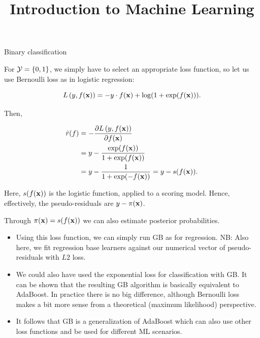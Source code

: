  





\newcommand{\titlefigure}{figure/boosting_classif_title.png}
\newcommand{\learninggoals}{
  \item Transfering gradient boosting for regression to binary classification problems
  \item Introducing gradient boosting for multiclass problems
}

\title{Introduction to Machine Learning}
\date{}





\begin{vbframe}{Binary classification}


For $\mathcal{Y} = \{0, 1\}$, we simply have to select an appropriate loss function, so let us
use Bernoulli loss as in logistic regression:

$$ L\left(y, f(\mathbf{x})\right) = - y \cdot f(\mathbf{x}) + \log(1 + \exp(f(\mathbf{x}))).$$

Then,

\vspace{-0.5cm}

\begin{align*}
\tilde{r}(f) &=-\frac{\partial{L\left(y, f(\mathbf{x})\right)}}{\partial f(\mathbf{x})} \\
&= y - \frac{\exp(f(\mathbf{x}))}{1 + \exp(f(\mathbf{x}))} \\
&= y - \frac{1}{1 + \exp(-f(\mathbf{x}))} = y - s(f(\mathbf{x})).
\end{align*}

Here, $s(f(\mathbf{x}))$ is the logistic function, applied to a scoring model.
Hence, effectively, the pseudo-residuals are $y - \pi(\mathbf{x})$.

Through $\pi(\mathbf{x}) = s(f(\mathbf{x}))$ we can also estimate posterior probabilities.

\framebreak
%

\begin{itemize}
\item Using this loss function, we can simply run GB as for regression.
  NB: Also here, we fit regression base learners against our numerical 
  vector of pseudo-residuals with $L2$ loss. 
\item  We could also have used the exponential loss for classification with 
  GB. It can be shown that the resulting GB algorithm is basically equivalent 
    to AdaBoost. In practice there is no big difference, although Bernoulli loss 
    makes a bit more sense from a theoretical (maximum likelihood) perspective.
\item It follows that GB is a generalization of AdaBoost which can also use other loss functions and be used for different ML scenarios.
\end{itemize}


\end{vbframe}

